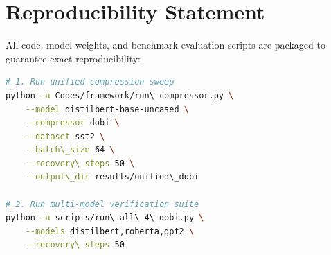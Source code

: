 \section{Reproducibility Statement}
All code, model weights, and benchmark evaluation scripts are packaged to guarantee exact reproducibility:
\begin{lstlisting}[language=bash]
# 1. Run unified compression sweep
python -u Codes/framework/run\_compressor.py \
    --model distilbert-base-uncased \
    --compressor dobi \
    --dataset sst2 \
    --batch\_size 64 \
    --recovery\_steps 50 \
    --output\_dir results/unified\_dobi

# 2. Run multi-model verification suite
python -u scripts/run\_all\_4\_dobi.py \
    --models distilbert,roberta,gpt2 \
    --recovery\_steps 50
\end{lstlisting}

